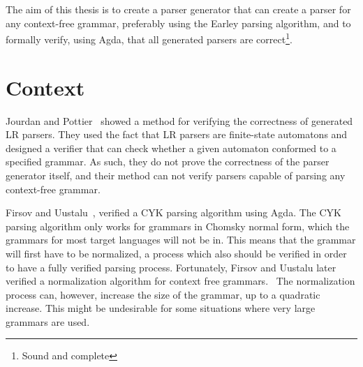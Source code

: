 \documentclass{article}
\begin{document}
	The aim of this thesis is to create a parser generator that can create a
	parser for any context-free grammar, preferably using the Earley parsing
	algorithm, and to formally verify, using Agda, that all generated parsers
	are correct\footnote{Sound and complete}. 
	



\section{Context}


	Jourdan and Pottier~\cite{Jourdan} showed a method for verifying the
	correctness of generated LR parsers. They used the fact that LR parsers are
	finite-state automatons and designed a verifier that can check whether a
	given automaton conformed to a specified grammar. As such, they do not 
	prove the correctness of the parser generator itself, and their method can 
	not verify parsers capable of parsing any context-free grammar.
	
	Firsov and Uustalu~\cite{Firsov14}, verified a CYK parsing algorithm using
	Agda. The CYK parsing algorithm only works for grammars in Chomsky normal
	form, which the grammars for most target languages will not be in. This
	means that the grammar will first have to be normalized, a process which
	also should be verified in order to have a fully verified parsing process.
	Fortunately, Firsov and Uustalu later verified a normalization algorithm
	for context free grammars.~\cite{Firsov15} The normalization process can,
	however, increase the size of the grammar, up to a quadratic increase. This
	might be undesirable for some situations where very large grammars are
	used.
\end{document}
